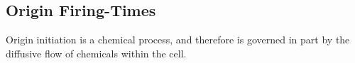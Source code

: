 \documentclass[serif]{sfuthesis}
\begin{document}
		\subsection{Origin Firing-Times}
		
		Origin initiation is a chemical process, and therefore is governed in part by the diffusive flow of chemicals within the cell.
		


			
			
			
			
\end{document}
